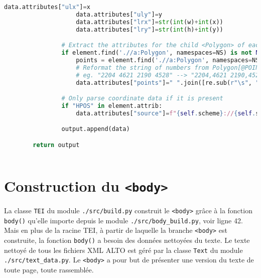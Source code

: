 \documentclass[class=article, crop=false]{standalone}
\begin{document}
\begin{lstlisting}[language=python, style=python]
                    data.attributes["ulx"]=x
                    data.attributes["uly"]=y
                    data.attributes["lrx"]=str(int(w)+int(x))
                    data.attributes["lry"]=str(int(h)+int(y))

                # Extract the attributes for the child <Polygon> of each targeted ALTO element and put that dictionary into a list
                if element.find('.//a:Polygon', namespaces=NS) is not None and element.find('.//a:Polygon', namespaces=NS).attrib["POINTS"] is not None:
                    points = element.find('.//a:Polygon', namespaces=NS).attrib["POINTS"]
                    # Reformat the string of numbers from Polygon[@POINTS] so that every 2nd value is joined to the previous value by a comma; 
                    # eg. "2204 4621 2190 4528" --> "2204,4621 2190,4528"
                    data.attributes["points"]=" ".join([re.sub(r"\s", ",", x) for x in re.findall(r"(\d+ \d+)", points)])

                # Only parse coordinate data if it is present
                if "HPOS" in element.attrib:
                    data.attributes["source"]=f"{self.scheme}://{self.server}{self.prefix}/{self.doc}/f{self.folio}/{x},{y},{w},{h}/full/0/native.jpg"

                output.append(data)

        return output
        
\end{lstlisting}

\section{Construction du \texttt{<body>}}
La classe \texttt{TEI} du module \texttt{./src/build.py} construit le \texttt{<body>} grâce à la fonction \texttt{body()} qu'elle importe depuis le module \texttt{./src/body\_build.py}, voir ligne 42. Mais en plus de la racine \acrshort{TEI}, à partir de laquelle la branche \texttt{<body>} est construite, la fonction \texttt{body()} a besoin des données nettoyées du texte. Le texte nettoyé de tous les fichiers \acrshort{XML} \acrshort{ALTO} est géré par la classe \texttt{Text} du module \texttt{./src/text\_data.py}. Le \texttt{<body>} a pour but de présenter une version du texte de toute page, toute rassemblée.
\end{document}

